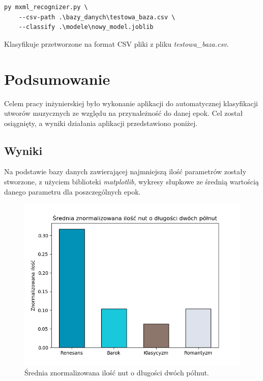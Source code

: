 \documentclass[printmode, eng, openany]{mgr}
\newcommand\tab[1][1cm]{\hspace*{#1}}
\begin{document}
\begin{lstlisting}
py mxml_recognizer.py \
	--csv-path .\bazy_danych\testowa_baza.csv \
	--classify .\modele\nowy_model.joblib
\end{lstlisting}
Klasyfikuje przetworzone na format CSV pliki z pliku \textit{testowa\_baza.csv}. 
\chapter{Podsumowanie}
\tab Celem pracy inżynierskiej było wykonanie aplikacji do automatycznej klasyfikacji utworów muzycznych ze względu na przynależność do danej epok. Cel został osiągnięty, a wyniki działania aplikacji przedstawiono poniżej.
\section{Wyniki}
\tab Na podstawie bazy danych zawierającej najmniejszą ilość parametrów zostały stworzone, z użyciem biblioteki  \textit{matplotlib}, wykresy słupkowe ze średnią wartością danego parametru dla poszczególnych epok. 
\begin{figure}[H]
\centering
\includegraphics[scale=0.75]{plots/2fullnotes.png}
\caption{Średnia znormalizowana ilość nut o długości dwóch półnut.}
\end{figure}
\end{document}
